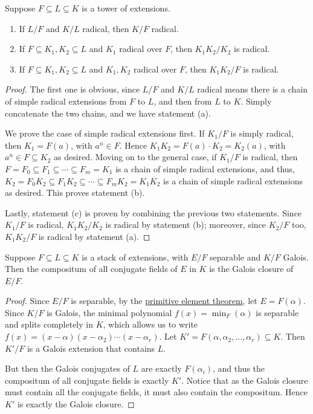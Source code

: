 \begin{lemma}\label{lem:radical-extension-properties}
    Suppose \(F \subseteq L \subseteq K\) is a tower of extensions.
    \begin{enumerate}[label={(\alph*)}, itemsep=0mm]
        \item If \(L/F\) and \(K/L\) radical, then \(K/F\) radical.
        \item If \(F \subseteq K_1,K_2 \subseteq L\) and \(K_1\) radical over \(F\),
            then \(K_1K_2/K_2\) is radical.
        \item If \(F \subseteq K_1,K_2 \subseteq L\) and \(K_1,K_2\) radical over \(F\),
            then \(K_1K_2/F\) is radical.
    \end{enumerate}
\end{lemma}
\begin{proof}
    The first one is obvious, since \(L/F\) and \(K/L\) radical means
    there is a chain of simple radical extensions from \(F\) to \(L\), and then from \(L\) to \(K\).
    Simply concatenate the two chains,
    and we have statement (a).

    We prove the case of simple radical extensions first.
    If \(K_1/F\) is simply radical, then \(K_1 = F(a)\), with \(a^n \in F\).
    Hence \(K_1K_2 = F(a) \cdot K_2 = K_2(a)\), with \(a^n \in F \subseteq K_2\) as desired.
    Moving on to the general case,
    if \(K_1/F\) is radical,
    then \(F = F_0 \subseteq F_1 \subseteq \cdots \subseteq F_m = K_1\) is a chain of simple radical extensions,
    and thus, \(K_2 = F_0K_2 \subseteq F_1K_2 \subseteq \cdots \subseteq F_m K_2 = K_1K_2\) is a chain of simple radical extensions as desired.
    This proves statement (b).

    Lastly, statement (c) is proven by combining the previous two statements.
    Since \(K_1/F\) is radical, \(K_1K_2/K_2\) is radical by statement (b);
    moreover, since \(K_2/F\) too, \(K_1K_2/F\) is radical by statement (a).
\end{proof}
\begin{lemma}\label{lem:compositum-galois-closure}
    Suppose \(F \subseteq L \subseteq K\) is a stack of extensions,
    with \(E/F\) separable and \(K/F\) Galois.
    Then the compositum of all conjugate fields of \(E\) in \(K\) is the Galois closure of \(E/F\).
\end{lemma}
\begin{proof}
    Since \(E/F\) is separable, by the \hyperref[thm:primitive-element-2]{primitive element theorem},
    let \(E = F(\alpha)\).
    Since \(K/F\) is Galois,
    the minimal polynomial \(f(x) = \min_F(\alpha)\) is separable and splits completely in \(K\),
    which allows us to write \(f(x) = (x-\alpha)(x-\alpha_2)\cdots(x-\alpha_r)\).
    Let \(K' = F(\alpha,\alpha_2,\hdots,\alpha_r) \subseteq K\).
    Then \(K'/F\) is a Galois extension that contains \(L\).
    
    But then the Galois conjugates of \(L\) are exactly \(F(\alpha_i)\),
    and thus the compositum of all conjugate fields is exactly \(K'\).
    Notice that as the Galois closure must contain all the conjugate fields,
    it must also contain the compositum.
    Hence \(K'\) is exactly the Galois closure.
\end{proof}
